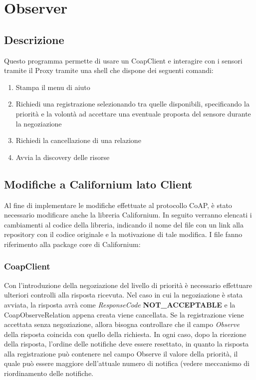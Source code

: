 \chapter{Observer}
	\section {Descrizione}
		Questo programma permette di usare un CoapClient e interagire con i sensori tramite il Proxy tramite una shell che dispone dei seguenti comandi:
		\begin{enumerate}
			\item Stampa il menu di aiuto
			\item Richiedi una registrazione selezionando tra quelle disponibili, specificando la priorità e la volontà ad accettare una eventuale proposta del sensore durante la negoziazione
			\item Richiedi la cancellazione di una relazione
			\item Avvia la discovery delle risorse
		\end{enumerate}
	\section {Modifiche a Californium lato Client}
			Al fine di implementare le modifiche effettuate al protocollo CoAP, è stato necessario modificare anche la libreria Californium. In seguito verranno elencati i cambiamenti al codice della libreria, indicando il nome del file con un link alla repository con il codice originale e la motivazione di tale modifica. I file fanno riferimento alla package core di Californium:

			\subsection{CoapClient}
				Con l'introduzione della negoziazione del livello di priorità è necessario effettuare ulteriori controlli alla risposta ricevuta. Nel caso in cui la negoziazione è stata avviata, la risposta avrà come \textit{ResponseCode} \textbf{NOT\_ACCEPTABLE} e la CoapObserveRelation appena creata viene cancellata. Se la registrazione viene accettata senza negoziazione, allora bisogna controllare che il campo \textit{Observe} della risposta coincida con quello della richiesta. In ogni caso, dopo la ricezione della risposta, l'ordine delle notifiche deve essere resettato, in quanto la risposta alla registrazione può contenere nel campo Observe il valore della priorità, il quale può essere maggiore dell'attuale numero di notifica (vedere meccanismo di riordinamento delle notifiche.\newline
				

